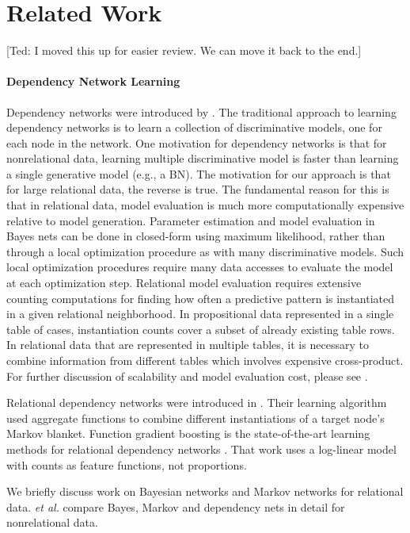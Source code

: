 \documentclass[twoside,11pt]{article}
\begin{document}
\section{Related Work} \label{sec:related} [Ted: I moved this up for easier review. We can move it back to the end.]

\paragraph{Dependency Network Learning} Dependency networks were introduced by \cite{Heckerman2000}. The traditional approach to learning dependency networks is to learn a collection of discriminative models, one for each node in the network. One motivation for dependency networks is that for nonrelational data, learning multiple discriminative model is faster than learning a single generative model (e.g., a BN). The motivation for our approach is that for large relational data, the reverse is true. The fundamental reason for this is that in relational data, model evaluation is much more computationally expensive relative to  model generation. Parameter estimation and model evaluation in Bayes nets can be done in closed-form using maximum likelihood, rather than through a local optimization procedure as with many discriminative models. Such local optimization procedures require many data accesses to evaluate the model at each optimization step.
Relational model evaluation requires extensive counting computations for finding how often a predictive pattern is instantiated in a given relational neighborhood. In propositional data represented in a single table of cases, instantiation counts cover a subset of already existing table rows. In relational data that are represented in multiple tables, it is necessary to combine information from different tables which involves expensive cross-product. For further  discussion of scalability and model evaluation cost, please see \cite{Neville2007}.

Relational dependency networks were introduced in \cite{Neville2007}. Their learning algorithm used aggregate functions to combine different instantiations of a target node's Markov blanket. Function gradient boosting is the state-of-the-art learning methods for relational dependency networks \cite{Khot2011}. That work uses a log-linear model with counts as feature functions, not proportions. 

We briefly discuss work on Bayesian networks and Markov networks for relational data. \cite{Heckerman2000} {\em et al.} compare Bayes, Markov and dependency nets in detail for nonrelational data. 
\end{document}
